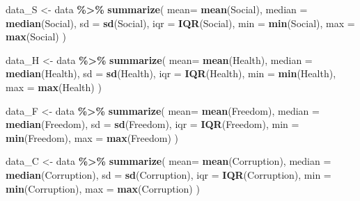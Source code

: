 \documentclass[
  11pt,
]{article}
\newenvironment{Shaded}{\begin{snugshade}}{\end{snugshade}}
\newcommand{\AttributeTok}[1]{\textcolor[rgb]{0.13,0.29,0.53}{#1}}
\newcommand{\FunctionTok}[1]{\textcolor[rgb]{0.13,0.29,0.53}{\textbf{#1}}}
\newcommand{\NormalTok}[1]{#1}
\newcommand{\OtherTok}[1]{\textcolor[rgb]{0.56,0.35,0.01}{#1}}
\newcommand{\SpecialCharTok}[1]{\textcolor[rgb]{0.81,0.36,0.00}{\textbf{#1}}}
\begin{document}
\begin{Shaded}
\begin{Highlighting}[]
\NormalTok{data\_S }\OtherTok{\textless{}{-}}\NormalTok{ data }\SpecialCharTok{\%\textgreater{}\%}
  \FunctionTok{summarize}\NormalTok{(}
    \AttributeTok{mean=} \FunctionTok{mean}\NormalTok{(Social),}
    \AttributeTok{median =} \FunctionTok{median}\NormalTok{(Social),}
    \AttributeTok{sd =} \FunctionTok{sd}\NormalTok{(Social),}
    \AttributeTok{iqr =} \FunctionTok{IQR}\NormalTok{(Social),}
    \AttributeTok{min =} \FunctionTok{min}\NormalTok{(Social),}
    \AttributeTok{max =} \FunctionTok{max}\NormalTok{(Social)}
\NormalTok{ )}
\end{Highlighting}
\end{Shaded}

\begin{Shaded}
\begin{Highlighting}[]
\NormalTok{data\_H }\OtherTok{\textless{}{-}}\NormalTok{ data }\SpecialCharTok{\%\textgreater{}\%}
  \FunctionTok{summarize}\NormalTok{(}
    \AttributeTok{mean=} \FunctionTok{mean}\NormalTok{(Health),}
    \AttributeTok{median =} \FunctionTok{median}\NormalTok{(Health),}
    \AttributeTok{sd =} \FunctionTok{sd}\NormalTok{(Health),}
    \AttributeTok{iqr =} \FunctionTok{IQR}\NormalTok{(Health),}
    \AttributeTok{min =} \FunctionTok{min}\NormalTok{(Health),}
    \AttributeTok{max =} \FunctionTok{max}\NormalTok{(Health)}
\NormalTok{ )}
\end{Highlighting}
\end{Shaded}

\begin{Shaded}
\begin{Highlighting}[]
\NormalTok{data\_F }\OtherTok{\textless{}{-}}\NormalTok{ data }\SpecialCharTok{\%\textgreater{}\%}
  \FunctionTok{summarize}\NormalTok{(}
    \AttributeTok{mean=} \FunctionTok{mean}\NormalTok{(Freedom),}
    \AttributeTok{median =} \FunctionTok{median}\NormalTok{(Freedom),}
    \AttributeTok{sd =} \FunctionTok{sd}\NormalTok{(Freedom),}
    \AttributeTok{iqr =} \FunctionTok{IQR}\NormalTok{(Freedom),}
    \AttributeTok{min =} \FunctionTok{min}\NormalTok{(Freedom),}
    \AttributeTok{max =} \FunctionTok{max}\NormalTok{(Freedom)}
\NormalTok{ )}
\end{Highlighting}
\end{Shaded}

\begin{Shaded}
\begin{Highlighting}[]
\NormalTok{data\_C }\OtherTok{\textless{}{-}}\NormalTok{ data }\SpecialCharTok{\%\textgreater{}\%}
  \FunctionTok{summarize}\NormalTok{(}
    \AttributeTok{mean=} \FunctionTok{mean}\NormalTok{(Corruption),}
    \AttributeTok{median =} \FunctionTok{median}\NormalTok{(Corruption),}
    \AttributeTok{sd =} \FunctionTok{sd}\NormalTok{(Corruption),}
    \AttributeTok{iqr =} \FunctionTok{IQR}\NormalTok{(Corruption),}
    \AttributeTok{min =} \FunctionTok{min}\NormalTok{(Corruption),}
    \AttributeTok{max =} \FunctionTok{max}\NormalTok{(Corruption)}
\NormalTok{ )}
\end{Highlighting}
\end{Shaded}
\end{document}
